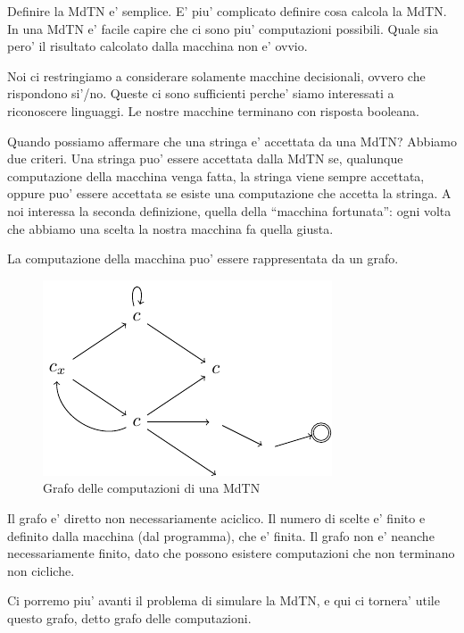 Definire la MdTN e' semplice. E' piu' complicato definire cosa calcola la MdTN. In una MdTN e'
facile capire che ci sono piu' computazioni possibili. Quale sia pero' il risultato calcolato dalla
macchina non e' ovvio.

Noi ci restringiamo a considerare solamente macchine decisionali, ovvero che rispondono si'/no.
Queste ci sono sufficienti perche' siamo interessati a riconoscere linguaggi. Le nostre macchine
terminano con risposta booleana.

Quando possiamo affermare che una stringa e' accettata da una MdTN? Abbiamo due criteri. Una stringa
puo' essere accettata dalla MdTN se, qualunque computazione della macchina venga fatta, la stringa
viene sempre accettata, oppure puo' essere accettata se esiste una computazione che accetta la
stringa. A noi interessa la seconda definizione, quella della ``macchina fortunata'': ogni volta che
abbiamo una scelta la nostra macchina fa quella giusta.


La computazione della macchina puo' essere rappresentata da un grafo.

\begin{figure}[h]
    \begin{center}
        \includegraphics{./img/nondeterminism/MdTN.pdf}    
        \caption{Grafo delle computazioni di una MdTN}
    \end{center}
\end{figure}

Il grafo e' diretto non necessariamente aciclico. Il numero di scelte e' finito e definito dalla
macchina (dal programma), che e' finita. Il grafo non e' neanche necessariamente finito, dato che
possono esistere computazioni che non terminano non cicliche.

Ci porremo piu' avanti il problema di simulare la MdTN, e qui ci tornera' utile questo grafo, detto
grafo delle computazioni.

